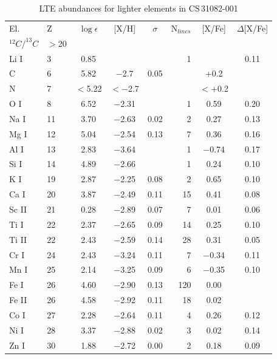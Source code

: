 \documentclass{aa}
\begin{document}
\begin{table}
\begin{center}
\caption{LTE abundances for lighter elements in CS\,31082-001
\label{T-elements} }
\begin{tabular}{llccc@{ }rc@{ }c}
\hline
El.   & Z& $\log \epsilon$ & [X/H] & $\sigma$ & N$_{lines}$ & [X/Fe] & 
$\Delta$[X/Fe]\\
\multispan2 $^{12}C/^{13}C$ & $>$20  \\
Li I  & 3 & 0.85 &   &  & 1 & & 0.11\\
C     & 6 & 5.82 & $-$2.7   & 0.05  & &  +0.2 &  \\ 
N     & 7 & $<$5.22 &$<-$2.7 &   &  &$<$+0.2&     \\ 
O I   & 8 & 6.52 &$-$2.31 &      &  1 &  0.59 & 0.20 \\
Na I  &11 & 3.70 &$-$2.63 & 0.02 &  2 &  0.27 & 0.13 \\
Mg I  &12 & 5.04 &$-$2.54 & 0.13 &  7 &  0.36 & 0.16 \\ 
Al I  &13 & 2.83 &$-$3.64 &      &  1 & $-$0.74 & 0.17 \\
Si I  &14 & 4.89 &$-$2.66 &      &  1 &  0.24 & 0.10 \\
K I   &19 & 2.87 &$-$2.25 &0.08  & 2  &  0.65 & 0.10 \\
Ca I  &20 & 3.87 &$-$2.49 & 0.11 & 15 &  0.41 & 0.08 \\
Sc II &21 & 0.28 &$-$2.89 & 0.07 &  7 &  0.01 & 0.06 \\
Ti I  &22 & 2.37 &$-$2.65 & 0.09 & 14 &  0.25 & 0.10 \\ 
Ti II &22 & 2.43 &$-$2.59 & 0.14 & 28 &  0.31 & 0.05 \\ 
Cr I  &24 & 2.43 &$-$3.24 & 0.11 &  7 & $-$0.34 & 0.11 \\
Mn I  &25 & 2.14 &$-$3.25 & 0.09 &  6 & $-$0.35 & 0.10 \\
Fe I  &26 & 4.60 &$-$2.90 & 0.13 &120 &  0.00 &  \\ 
Fe II &26 & 4.58 &$-$2.92 & 0.11 & 18 &  0.02 &  \\ 
Co I  &27 & 2.28 &$-$2.64 & 0.11 &  4 &  0.26 & 0.12 \\
Ni I  &28 & 3.37 &$-$2.88 & 0.02 &  3 &  0.02 & 0.14 \\
Zn I  &30 & 1.88 &$-$2.72 & 0.00 &  2 &  0.18 & 0.09 \\
\hline \hline
\end{tabular}
\end{center}
\end{table}
\end{document}
